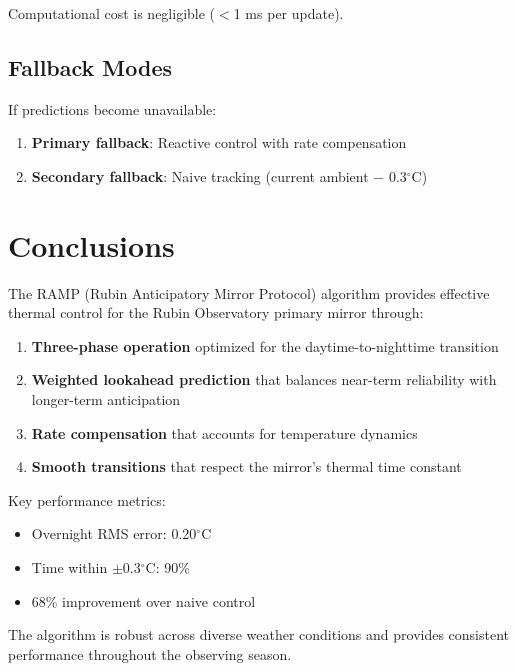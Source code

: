 \documentclass[11pt,letterpaper]{article}
\begin{document}
Computational cost is negligible ($<$1 ms per update).

\subsection{Fallback Modes}

If predictions become unavailable:
\begin{enumerate}[noitemsep]
    \item \textbf{Primary fallback}: Reactive control with rate compensation
    \item \textbf{Secondary fallback}: Naive tracking (current ambient $-$ 0.3$^\circ$C)
\end{enumerate}

\section{Conclusions}

The RAMP (Rubin Anticipatory Mirror Protocol) algorithm provides effective thermal control for the Rubin Observatory primary mirror through:

\begin{enumerate}
    \item \textbf{Three-phase operation} optimized for the daytime-to-nighttime transition
    \item \textbf{Weighted lookahead prediction} that balances near-term reliability with longer-term anticipation
    \item \textbf{Rate compensation} that accounts for temperature dynamics
    \item \textbf{Smooth transitions} that respect the mirror's thermal time constant
\end{enumerate}

Key performance metrics:
\begin{itemize}[noitemsep]
    \item Overnight RMS error: 0.20$^\circ$C
    \item Time within $\pm$0.3$^\circ$C: 90\%
    \item 68\% improvement over naive control
\end{itemize}

The algorithm is robust across diverse weather conditions and provides consistent performance throughout the observing season.
\end{document}
